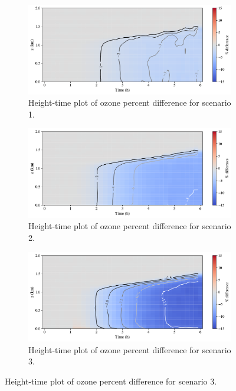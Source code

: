 \begin{figure}[h]
  \centering
  \begin{subfigure}
    \centering
    \includegraphics[width=.8\textwidth]{figures/height-time-pdiff-o3-fx1fy0.pdf}
    \caption{Height-time plot of ozone percent difference for scenario 1.}
  \end{subfigure}
     \vspace*{5mm} 
  \begin{subfigure}
    \centering
    \includegraphics[width=.8\textwidth]{figures/height-time-pdiff-o3-road-10x.pdf}
    \caption{Height-time plot of ozone percent difference for scenario 2.}
  \end{subfigure}
   \vspace*{5mm} 
  \begin{subfigure}
    \centering
    \includegraphics[width=.8\textwidth]{figures/height-time-pdiff-o3-point-source-1x1.pdf}
    \caption{Height-time plot of ozone percent difference for scenario 3.}
  \end{subfigure}
\end{figure}

